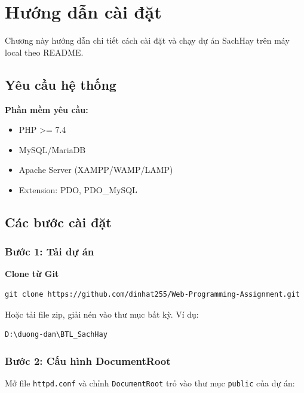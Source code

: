 
\section{Hướng dẫn cài đặt}

Chương này hướng dẫn chi tiết cách cài đặt và chạy dự án SachHay trên máy local theo README.

\subsection{Yêu cầu hệ thống}

\textbf{Phần mềm yêu cầu:}
\begin{itemize}
    \item PHP >= 7.4
    \item MySQL/MariaDB
    \item Apache Server (XAMPP/WAMP/LAMP)
    \item Extension: PDO, PDO\_MySQL
\end{itemize}

\subsection{Các bước cài đặt}

\subsubsection{Bước 1: Tải dự án}

\textbf{Clone từ Git}
\begin{verbatim}
git clone https://github.com/dinhat255/Web-Programming-Assignment.git
\end{verbatim}

Hoặc tải file zip, giải nén vào thư mục bất kỳ. Ví dụ:
\begin{verbatim}
D:\duong-dan\BTL_SachHay
\end{verbatim}

\subsubsection{Bước 2: Cấu hình DocumentRoot}

Mở file \texttt{httpd.conf} và chỉnh \texttt{DocumentRoot} trỏ vào thư mục \texttt{public} của dự án:

